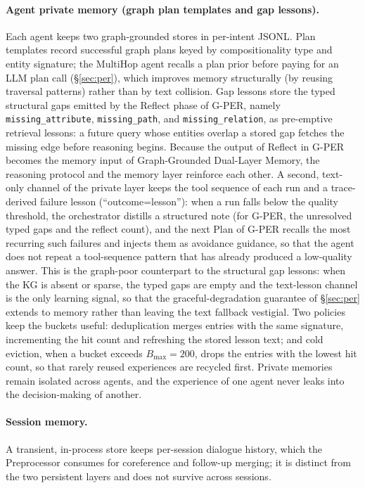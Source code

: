 \documentclass[11pt,a4paper]{article}
\begin{document}
\paragraph{Agent private memory (graph plan templates and gap lessons).}
Each agent keeps two graph-grounded stores in per-intent JSONL.
Plan templates record successful graph plans keyed by compositionality type and entity signature; the MultiHop agent recalls a plan prior before paying for an LLM plan call (\S\ref{sec:per}), which improves memory structurally (by reusing traversal patterns) rather than by text collision.
Gap lessons store the typed structural gaps emitted by the Reflect phase of G-PER, namely \texttt{missing\_attribute}, \texttt{missing\_path}, and \texttt{missing\_relation}, as pre-emptive retrieval lessons: a future query whose entities overlap a stored gap fetches the missing edge before reasoning begins.
Because the output of Reflect in G-PER becomes the memory input of Graph-Grounded Dual-Layer Memory, the reasoning protocol and the memory layer reinforce each other.
A second, text-only channel of the private layer keeps the tool sequence of each run and a trace-derived failure lesson (``outcome=lesson''): when a run falls below the quality threshold, the orchestrator distills a structured note (for G-PER, the unresolved typed gaps and the reflect count), and the next Plan of G-PER recalls the most recurring such failures and injects them as avoidance guidance, so that the agent does not repeat a tool-sequence pattern that has already produced a low-quality answer.
This is the graph-poor counterpart to the structural gap lessons: when the KG is absent or sparse, the typed gaps are empty and the text-lesson channel is the only learning signal, so that the graceful-degradation guarantee of \S\ref{sec:per} extends to memory rather than leaving the text fallback vestigial.
Two policies keep the buckets useful: deduplication merges entries with the same signature, incrementing the hit count and refreshing the stored lesson text; and cold eviction, when a bucket exceeds $B_{\max}{=}200$, drops the entries with the lowest hit count, so that rarely reused experiences are recycled first.
Private memories remain isolated across agents, and the experience of one agent never leaks into the decision-making of another.

\paragraph{Session memory.}
A transient, in-process store keeps per-session dialogue history, which the Preprocessor consumes for coreference and follow-up merging; it is distinct from the two persistent layers and does not survive across sessions.
\end{document}
